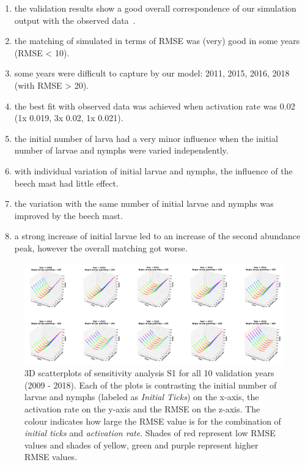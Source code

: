 \documentclass[a4paper, 11pt]{scrartcl}
\begin{document}
\begin{enumerate}
\item the validation results show a good overall correspondence of our simulation output with the observed data~\parencite{Brugger.2017}.
\item the matching of simulated in terms of RMSE was (very) good in some years (RMSE < 10).
\item some years were difficult to capture by our model: 2011, 2015, 2016, 2018 (with RMSE > 20).
\item the best fit with observed data was achieved when activation rate was 0.02 (1x 0.019,  3x 0.02,  1x 0.021).
\item the initial number of larva had a very minor influence when the initial number of larvae and nymphs were varied independently.
\item with individual variation of initial larvae and nymphs, the influence of the beech mast had little effect.
\item the variation with the same number of initial larvae and nymphs was improved by the beech mast.
\item a strong increase of initial larvae led to an increase of the second abundance peak, however the overall matching got worse.
\end{enumerate}


\printbibliography[heading = bibintoc, title = {Bibliography}]


\newpage

\begin{figure}
\centering
\includegraphics[width=1.0\textwidth]{figures/initial_ticks_with_beech_error}
\caption{3D scatterplots of sensitivity analysis S1 for all 10 validation years (2009 - 2018). Each of the plots is contrasting the initial number of larvae and nymphs
(labeled as \textit{Initial Ticks}) on the x-axis, the activation rate on the y-axis and the RMSE on the z-axis. The colour indicates how large the RMSE value is for the
combination of \textit{initial ticks} and \textit{activation rate}. Shades of red represent low RMSE values and shades of yellow, green and purple represent higher RMSE values.}
\label{fig:initial_ticks_with_beech_error_rotated}
\end{figure}
\end{document}
